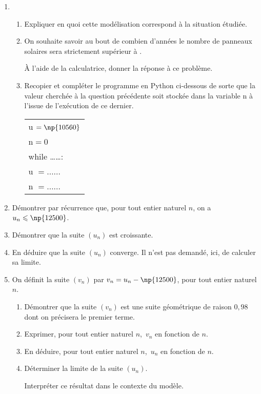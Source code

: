 \documentclass[11pt,a4paper]{article}
\begin{document}
\begin{enumerate}
\item
	\begin{enumerate}
		\item  Expliquer en quoi cette modélisation correspond à la situation étudiée.
		\item  On souhaite savoir au bout de combien d'années le nombre de panneaux solaires sera strictement supérieur à .
		
À l'aide de la calculatrice, donner la réponse à ce
problème.
		\item  Recopier et compléter le programme en Python ci-dessous de sorte que la valeur
cherchée à la question précédente soit stockée dans la variable n à l'issue de l'exécution de ce dernier.
\begin{center}
\begin{tabular}{|l|}\hline
u $= \np{10560}$\\
n$ =0$\\
while  \ldots \ldots :\\
\qquad u $= \ldots \ldots$ \\
\qquad n $= \ldots \ldots$\\ \hline
\end{tabular}
\end{center}

	\end{enumerate}
\item Démontrer par récurrence que, pour tout entier naturel $n$, on a $u_n \leqslant \np{12500}$.
\item Démontrer que la suite $\left(u_n\right)$ est croissante.
\item En déduire que la suite $\left(u_n\right)$ converge. Il n'est pas demandé, ici, de calculer sa limite.
\item On définit la suite $\left(v_n\right)$  par $v_n = u_n - \np{12500}$, pour tout entier naturel $n$.
	\begin{enumerate}
		\item Démontrer que la suite $\left(v_n\right)$ est une suite géométrique de raison $0,98$ dont on précisera le premier terme.
		\item Exprimer, pour tout entier naturel $n$,\, $v_n$ en fonction de $n$.
		\item En déduire, pour tout entier naturel $n$,\, $u_n$ en fonction de $n$.
		\item Déterminer la limite de la suite $\left(u_n\right)$.
		
Interpréter ce résultat dans le contexte du modèle.
	\end{enumerate}
\end{enumerate}
\end{document}
